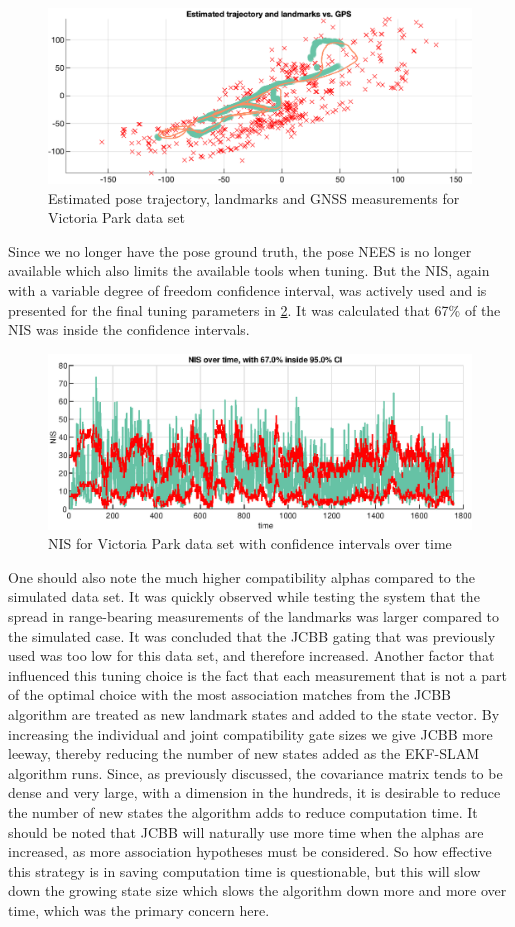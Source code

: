 \begin{figure}[!htb]
    \centering
    \includegraphics[width=0.6\linewidth]{figures/ga_3/real_trajectory.eps}
    \caption{Estimated pose trajectory, landmarks and GNSS measurements for Victoria Park data set}
    \label{fig:ga_3_real_trajectory}
\end{figure}

Since we no longer have the pose ground truth, the pose NEES is no longer available which also limits the available tools when tuning. But the NIS, again with a variable degree of freedom confidence interval, was actively used and is presented for the final tuning parameters in \cref{fig:ga_3_real_NIS}. It was calculated that 67\% of the NIS was inside the confidence intervals.  

\begin{figure}[!htb]
    \centering
    \includegraphics[width=0.7\linewidth]{figures/ga_3/real_NIS.eps}
    \caption{NIS for Victoria Park data set with confidence intervals over time}
    \label{fig:ga_3_real_NIS}
\end{figure}

One should also note the much higher compatibility alphas compared to the simulated data set. It was quickly observed while testing the system that the spread in range-bearing measurements of the landmarks was larger compared to the simulated case. It was concluded that the JCBB gating that was previously used was too low for this data set, and therefore increased. Another factor that influenced this tuning choice is the fact that each measurement that is not a part of the optimal choice with the most association matches from the JCBB algorithm are treated as new landmark states and added to the state vector. By increasing the individual and joint compatibility gate sizes we give JCBB more leeway, thereby reducing the number of new states added as the EKF-SLAM algorithm runs. Since, as previously discussed, the covariance matrix tends to be dense and very large, with a dimension in the hundreds, it is desirable to reduce the number of new states the algorithm adds to reduce computation time. It should be noted that JCBB will naturally use more time when the alphas are increased, as more association hypotheses must be considered. So how effective this strategy is in saving computation time is questionable, but this will slow down the growing state size which slows the algorithm down more and more over time, which was the primary concern here. 

